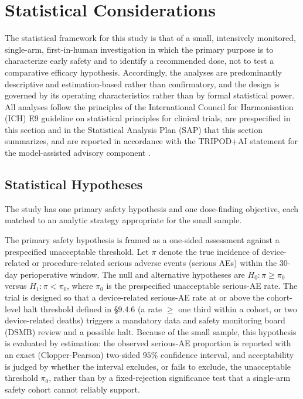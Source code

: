 \section{Statistical Considerations}

The statistical framework for this study is that of a small, intensively
monitored, single-arm, first-in-human investigation in which the primary purpose
is to characterize early safety and to identify a recommended dose, not to test a
comparative efficacy hypothesis. Accordingly, the analyses are predominantly
descriptive and estimation-based rather than confirmatory, and the design is
governed by its operating characteristics rather than by formal statistical power.
All analyses follow the principles of the International Council for Harmonisation
(ICH) E9 guideline on statistical principles for clinical trials, are prespecified
in this section and in the Statistical Analysis Plan (SAP) that this section
summarizes, and are reported in accordance with the TRIPOD+AI statement for the
model-assisted advisory component \cite{Collins2024tripodai}.

\subsection{Statistical Hypotheses}

The study has one primary safety hypothesis and one dose-finding objective, each
matched to an analytic strategy appropriate for the small sample.

The primary safety hypothesis is framed as a one-sided assessment against a
prespecified unacceptable threshold. Let $\pi$ denote the true incidence of
device-related or procedure-related serious adverse events (serious AEs) within
the 30-day perioperative window. The null and alternative hypotheses are
$H_0\!: \pi \geq \pi_0$ versus $H_1\!: \pi < \pi_0$, where $\pi_0$ is the
prespecified unacceptable serious-AE rate. The trial is designed so that a
device-related serious-AE rate at or above the cohort-level halt threshold defined
in \S9.4.6 (a rate $\geq$ one third within a cohort, or two device-related deaths)
triggers a mandatory data and safety monitoring board (DSMB) review and a possible
halt. Because of the small sample, this hypothesis is evaluated by estimation: the
observed serious-AE proportion is reported with an exact (Clopper-Pearson) two-sided
$95\%$ confidence interval, and acceptability is judged by whether the interval
excludes, or fails to exclude, the unacceptable threshold $\pi_0$, rather than by a
fixed-rejection significance test that a single-arm safety cohort cannot reliably
support.

